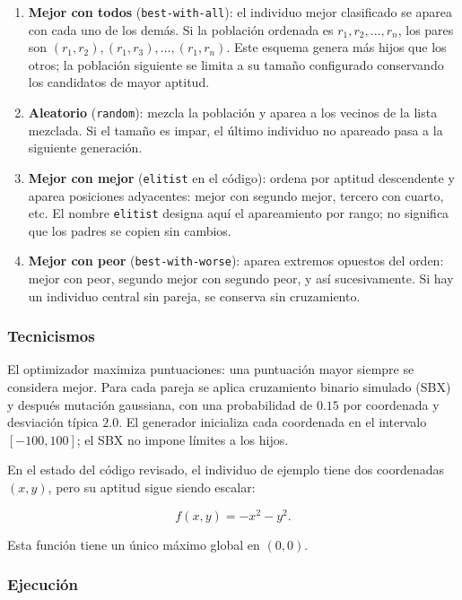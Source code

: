 \documentclass[12pt,a4paper]{article}
\begin{document}
\begin{enumerate}
  \item \textbf{Mejor con todos} (\texttt{best-with-all}): el individuo mejor
    clasificado se aparea con cada uno de los demás. Si la población ordenada es
    \(r_1,r_2,\ldots,r_n\), los pares son
    \((r_1,r_2),(r_1,r_3),\ldots,(r_1,r_n)\). Este esquema genera más hijos que
    los otros; la población siguiente se limita a su tamaño configurado
    conservando los candidatos de mayor aptitud.
  \item \textbf{Aleatorio} (\texttt{random}): mezcla la población y aparea a los
    vecinos de la lista mezclada. Si el tamaño es impar, el último individuo no
    apareado pasa a la siguiente generación.
  \item \textbf{Mejor con mejor} (\texttt{elitist} en el código): ordena por
    aptitud descendente y aparea posiciones adyacentes: mejor con segundo mejor,
    tercero con cuarto, etc. El nombre \texttt{elitist} designa aquí el
    apareamiento por rango; no significa que los padres se copien sin cambios.
  \item \textbf{Mejor con peor} (\texttt{best-with-worse}): aparea extremos
    opuestos del orden: mejor con peor, segundo mejor con segundo peor, y así
    sucesivamente. Si hay un individuo central sin pareja, se conserva sin
    cruzamiento.
\end{enumerate}

\subsubsection{Tecnicismos}

El optimizador maximiza puntuaciones: una puntuación mayor siempre se considera
mejor. Para cada pareja se aplica cruzamiento binario simulado (SBX) y después
mutación gaussiana, con una probabilidad de \(0.15\) por coordenada y desviación
típica \(2.0\). El generador inicializa cada coordenada en el intervalo
\([-100,100]\); el SBX no impone límites a los hijos.

En el estado del código revisado, el individuo de ejemplo tiene dos
coordenadas \((x,y)\), pero su aptitud sigue siendo escalar:

\[
  f(x,y)=-x^2-y^2.
\]

Esta función tiene un único máximo global en \((0,0)\).

\subsubsection{Ejecución}
\end{document}
